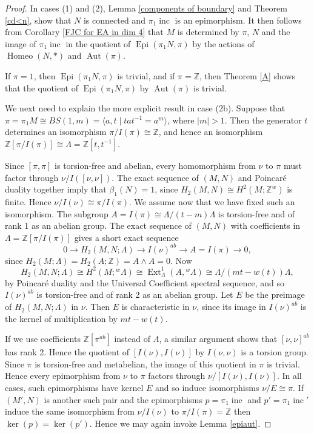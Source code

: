 \documentclass[10pt,a4paper]{amsart}
\DeclareMathOperator{\Aut}{Aut}
\DeclareMathOperator{\Epi}{Epi}
\DeclareMathOperator{\Ext}{Ext}
\DeclareMathOperator{\Homeo}{Homeo}
\DeclareMathOperator{\inc}{inc}
\newcommand{\Z}{\mathbb Z}
\begin{document}
\begin{proof}
In cases (1) and (2), Lemma \ref{components of boundary} and Theorem \ref{cd<n}, show that $N$ is connected and $
\pi_1\inc$ is an epimorphism.   It then follows from Corollary \ref{FJC for EA in dim 4} that $M$ is determined by $\pi$, $N$ and the image of $\pi_1\inc$ in the quotient
of $\Epi(\pi_1N,\pi)$  by the actions of $\Homeo(N,*)$ and $\Aut(\pi)$.

If $\pi = 1$, then $\Epi(\pi_1N,\pi)$ is trivial, and if $\pi = \Z$, then Theorem \ref{A} shows that the quotient of $\Epi(\pi_1N,\pi)$ by $\Aut(\pi)$ is trivial.



We next need to explain the more explicit result in case (2b).
Suppose that $\pi=\pi_1M\cong{BS(1,m)}=\langle{a,t}\mid{tat^{-1}=a^m}\rangle$,  where $|m|>1$.
Then the generator $t$ determines an isomorphism $\pi/I(\pi)\cong\Z$,
and hence an isomorphism $\Z[\pi/I(\pi)]\cong\Lambda=\Z[t,t^{-1}]$.

Since $[\pi,\pi]$ is torsion-free and abelian, 
every homomorphism from $\nu$ to $\pi$ must factor through $\nu/I([\nu,\nu])$. 
The exact sequence of $(M,N)$ and Poincar\'e duality together imply that $\beta_1(N)=1$,
since $H_2(M,N)\cong{H^2(M;\Z^w)}$ is finite.
Hence $\nu/I(\nu)\cong\pi/I(\pi)$.
We assume now that we have fixed such an isomorphism.
The subgroup $A=I(\pi)\cong\Lambda/(t-m)\Lambda$ is torsion-free and of rank 1 
as an abelian group.
The exact sequence of $(M,N)$ with coefficients in $\Lambda=\Z[\pi/I(\pi)]$ 
gives a short exact sequence
\[
0\to{H_2(M,N;\Lambda)}\to{I(\nu)^{ab}}\to{A=I(\pi)}\to0,
\]
since $H_2(M;\Lambda)=H_2(A;\mathbb{Z})=A\wedge{A}=0$.
Now 
\[
H_2(M,N;\Lambda)\cong{H^2(M;{}^w\Lambda)}\cong
{\Ext^1_\Lambda(A,{}^w\Lambda)}\cong\Lambda/(mt-w(t))\Lambda,
\]
by Poincar\'e duality and the Universal Coefficient spectral sequence,
and so $I(\nu)^{ab}$ is torsion-free and of rank 2 as an abelian group.
Let $E$ be the preimage of $H_2(M,N;\Lambda)$ in $\nu$.
Then $E$ is characteristic in $\nu$, since
its image in $I(\nu)^{ab}$ is the kernel of multiplication by $mt-w(t)$.

If we use coefficients $\Z[\pi^{ab}]$ instead of $\Lambda$,
a similar argument shows that $[\nu,\nu]^{ab}$ has rank 2.
Hence the quotient of $[I(\nu),I(\nu)]$ by $I(\nu,\nu)$ is a torsion group.
Since $\pi$ is torsion-free and metabelian, the image of this quotient in $\pi$ is trivial.
Hence every epimorphism from $\nu$ to $\pi$ factors through $\nu/[I(\nu),I(\nu)]$.
In all cases, such epimorphisms have kernel $E$ and so induce isomorphisms 
$\nu/E\cong\pi$.
If $(M',N)$ is another such pair and the epimorphisms $p=\pi_1\inc$ 
and $p'=\pi_1\inc'$
induce the same isomorphism from $\nu/I(\nu)$ to $\pi/I(\pi)=\Z$ 
then $\ker(p)=\ker(p')$.
Hence we may again invoke Lemma \ref{epiaut}.


\end{proof}
\end{document}
